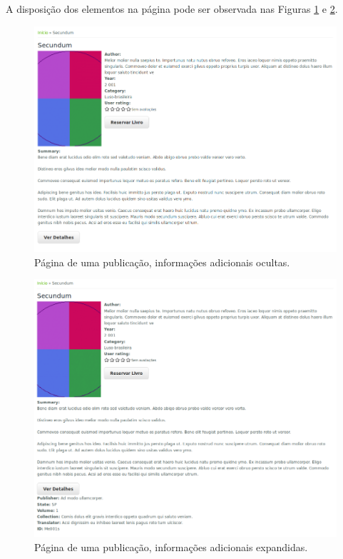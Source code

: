 \documentclass[a4paper]{article}
\begin{document}
A disposição dos elementos na página pode ser observada nas Figuras \ref{colapsed} e \ref{expanded}.

\begin{figure}[pbth!]
\centering
\includegraphics[width=140mm]{img/publication-colapsed.png}
\caption{Página de uma publicação, informações adicionais ocultas.\label{colapsed}}
\end{figure}

\begin{figure}[pbth!]
\centering
\includegraphics[width=140mm]{img/publication-expanded.png}
\caption{Página de uma publicação, informações adicionais expandidas.\label{expanded}}
\end{figure}
\end{document}
